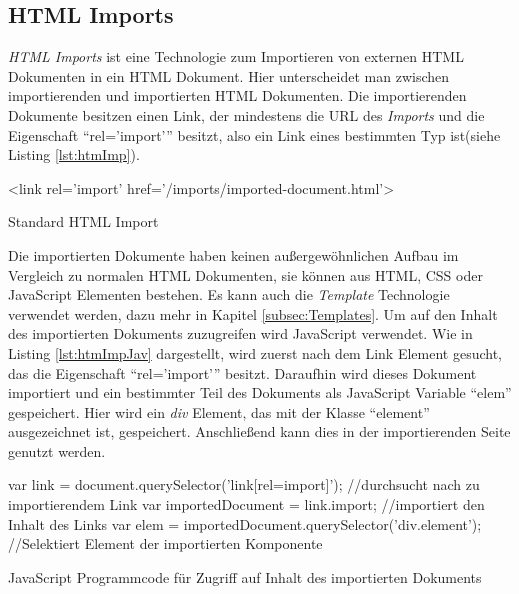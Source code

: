 \documentclass[12pt, paper=a4, bibtotoc, toc=listof, headsepline=true]{scrreprt}
\begin{document}
		\subsection{HTML Imports}
		\emph{\ac{HTML} Imports} ist eine Technologie zum Importieren von externen \ac{HTML} Dokumenten in ein \ac{HTML} Dokument. Hier unterscheidet man zwischen importierenden und importierten \ac{HTML} Dokumenten. Die importierenden Dokumente besitzen einen Link, der mindestens die \ac{URL} des \emph{Imports} und die Eigenschaft \enquote{rel='import'} besitzt, also ein Link eines bestimmten Typ ist\cite{Glazkov2016}(siehe Listing \ref{lst:htmImp}). 
		\begin{listing}
			\begin{HTMLcode*}{}
 <link rel='import' href='/imports/imported-document.html'>
				\end{HTMLcode*}
			\caption{Standard HTML Import}
			\label{lst:htmImp}
		\end{listing}
		Die importierten Dokumente haben keinen außergewöhnlichen Aufbau im Vergleich zu normalen \ac{HTML} Dokumenten, sie können aus \ac{HTML}, \ac{CSS} oder JavaScript Elementen bestehen. Es kann auch die \emph{Template} Technologie verwendet werden, dazu mehr in Kapitel \ref{subsec:Templates}.
		Um auf den Inhalt des importierten Dokuments zuzugreifen wird JavaScript verwendet. Wie in Listing \ref{lst:htmImpJav} dargestellt, wird zuerst nach dem Link Element gesucht, das die Eigenschaft \enquote{rel='import'} besitzt. Daraufhin wird dieses Dokument importiert und ein bestimmter Teil des Dokuments als JavaScript Variable \enquote{elem} gespeichert. Hier wird ein \emph{div} Element, das mit der Klasse \enquote{element} ausgezeichnet ist, gespeichert. Anschließend kann dies in der importierenden Seite genutzt werden. 
		\begin{listing}
			\begin{JavaScriptcode*}{}
var link = document.querySelector('link[rel=import]'); //durchsucht nach zu importierendem Link
var importedDocument = link.import; //importiert den Inhalt des Links
var elem = importedDocument.querySelector('div.element');  //Selektiert Element der importierten Komponente
			\end{JavaScriptcode*}
			\caption[Zugriff auf importiertes Dokument]{JavaScript Programmcode für Zugriff auf Inhalt des importierten Dokuments}
			\label{lst:htmImpJav}
		\end{listing} 
\end{document}
